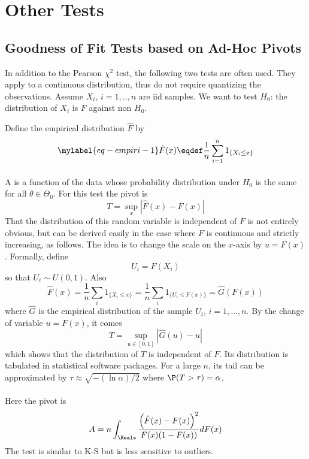 \section{Other Tests}
\subsection{Goodness of Fit Tests based on Ad-Hoc Pivots}
\label{sec-skku}  In addition to the Pearson $\chi^2$ test, the
following two tests are often used. They apply to a continuous
distribution, thus do not require quantizing the observations.
Assume $X_i$, $i=1,..,n$ are iid samples. We want to test
$H_0$: the distribution of $X_i$ is $F$ against non $H_0$.

Define the empirical distribution $\hat{F}$ by
\begin{equation}\mylabel{eq-empiri-1}
  \hat{F}(x)\eqdef\frac{1}{n}\sum_{i=1}^n 1_{\{X_i \leq x\}}
\end{equation}


\paragraph{}
A  is a function of the data whose probability distribution under $H_0$ is the same for all $\theta \in\Theta_0$. For this test the pivot is
$$
T=\sup_x|\hat{F}(x)-F(x)|
$$
That the distribution of this random variable is independent of $F$ is not entirely obvious, but
can be derived easily in the case where $F$ is continuous and strictly increasing, as follows.
The idea is to change the scale on the $x$-axis by $u=F(x)$. Formally, define
$$
U_i=F(X_i)
$$
so that $U_i\sim U(0,1)$. Also
$$\hat{F}(x)=\frac{1}{n}\sum_i 1_{\{X_i \leq x\}}=\frac{1}{n}\sum_i 1_{\{U_i \leq
F(x)\}}=\hat{G}(F(x))$$ where $\hat{G}$ is the empirical distribution of the sample $U_i$,
$i=1,...,n$. By the change of variable $u=F(x)$, it comes
 $$T=\sup_{u\in[0,1]} |\hat{G}(u)-u|
 $$
which shows that the distribution of $T$ is independent of
$F$. Its distribution is tabulated in statistical software
packages. For a large $n$, its tail can be approximated by
$\tau \approx \sqrt{-(\ln \alpha)/2}$ where
$\P(T>\tau)=\alpha$.

\paragraph{}
Here the pivot is
$$
 A =n \int_{\Reals}\frac{\left(\hat{F}(x)-F(x)\right)^2}{F(x)(1-F(x))}dF(x)
$$
The test is similar to K-S but is less sensitive to outliers.


